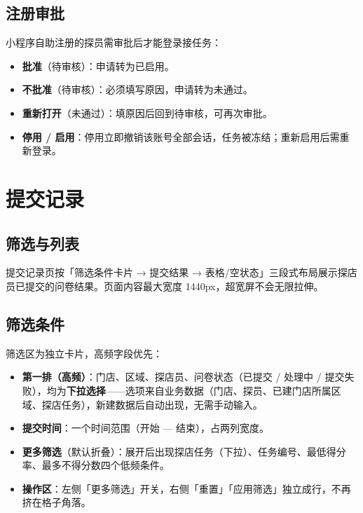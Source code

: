 \documentclass[12pt,a4paper,fontset=none]{ctexart}
\begin{document}
\subsection{注册审批}
小程序自助注册的探员需审批后才能登录接任务：

\begin{itemize}
\item \textbf{批准}（待审核）：申请转为已启用。
\item \textbf{不批准}（待审核）：必须填写原因，申请转为未通过。
\item \textbf{重新打开}（未通过）：填原因后回到待审核，可再次审批。
\item \textbf{停用 / 启用}：停用立即撤销该账号全部会话，任务被冻结；重新启用后需重新登录。
\end{itemize}


\section{提交记录}

\subsection{筛选与列表}
提交记录页按「筛选条件卡片 → 提交结果 → 表格/空状态」三段式布局展示探店员已提交的问卷结果。页面内容最大宽度 1440px，超宽屏不会无限拉伸。

\subsection{筛选条件}
筛选区为独立卡片，高频字段优先：

\begin{itemize}
\item \textbf{第一排（高频）}：门店、区域、探店员、问卷状态（已提交 / 处理中 / 提交失败），均为\textbf{下拉选择}——选项来自业务数据（门店、探员、已建门店所属区域、探店任务），新建数据后自动出现，无需手动输入。
\item \textbf{提交时间}：一个时间范围（开始 — 结束），占两列宽度。
\item \textbf{更多筛选}（默认折叠）：展开后出现探店任务（下拉）、任务编号、最低得分率、最多不得分数四个低频条件。
\item \textbf{操作区}：左侧「更多筛选」开关，右侧「重置」「应用筛选」独立成行，不再挤在格子角落。
\end{itemize}
\end{document}
